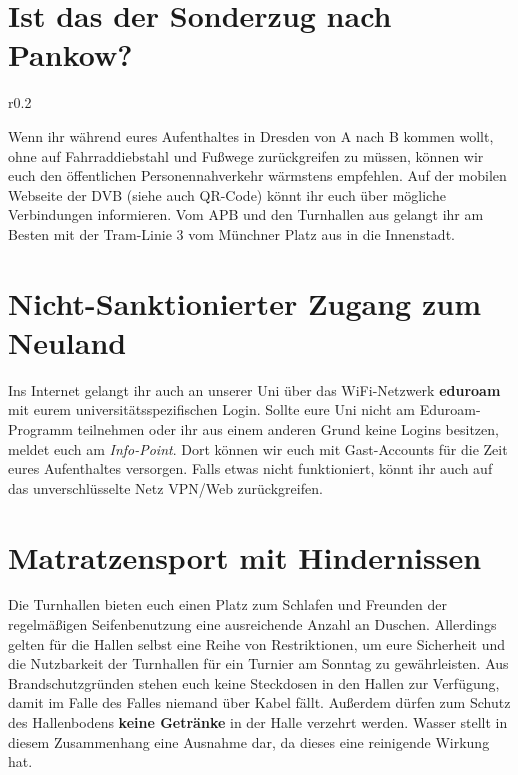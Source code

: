 \section*{Ist das der Sonderzug nach Pankow?}

\begin{wrapfigure}[6]{r}{0.2\textwidth}
  \vspace*{-11pt}
  \textcolor{KIFgrey}{}
\end{wrapfigure}

Wenn ihr während eures Aufenthaltes in Dresden von A nach B kommen wollt, ohne auf Fahrraddiebstahl und Fußwege zurückgreifen zu müssen, können wir euch den öffentlichen Personennahverkehr wärmstens empfehlen.
Auf der mobilen Webseite der DVB  (siehe auch QR-Code) könnt ihr euch über mögliche Verbindungen informieren.
Vom APB und den Turnhallen aus gelangt ihr am Besten mit der Tram-Linie 3 vom Münchner Platz aus in die Innenstadt.

\section*{Nicht-Sanktionierter Zugang zum Neuland}

Ins Internet gelangt ihr auch an unserer Uni über das WiFi-Netzwerk \textbf{eduroam} mit eurem universitätsspezifischen Login.
Sollte eure Uni nicht am Eduroam-Programm teilnehmen oder ihr aus einem anderen Grund keine Logins besitzen, meldet euch am \emph{Info-Point}.
Dort können wir euch mit Gast-Accounts für die Zeit eures Aufenthaltes versorgen.
Falls etwas nicht funktioniert, könnt ihr auch auf das unverschlüsselte Netz VPN/Web zurückgreifen.

\section*{Matratzensport mit Hindernissen}

Die Turnhallen bieten euch einen Platz zum Schlafen und Freunden der regelmäßigen Seifenbenutzung eine ausreichende Anzahl an Duschen.
Allerdings gelten für die Hallen selbst eine Reihe von Restriktionen, um eure Sicherheit und die Nutzbarkeit der Turnhallen für ein Turnier am Sonntag zu gewährleisten.
Aus Brandschutzgründen stehen euch keine Steckdosen in den Hallen zur Verfügung, damit im Falle des Falles niemand über Kabel fällt.
Außerdem dürfen zum Schutz des Hallenbodens \textbf{keine Getränke} in der Halle verzehrt werden.
Wasser stellt in diesem Zusammenhang eine Ausnahme dar, da dieses eine reinigende Wirkung hat.


